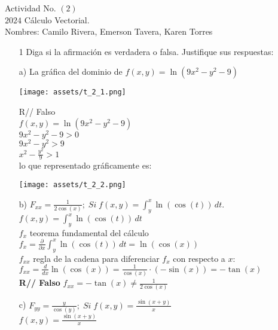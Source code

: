 \documentclass[14pt]{memoir}
\begin{document}
\begin{center}
			\centering
			Actividad No. $(2)$\\
			$2024$ Cálculo Vectorial.\\
			Nombres:  Camilo Rivera, Emerson Tavera, Karen Torres
\end{center}

\begin{enumerate}

	\item[ 1] Diga si la afirmación es verdadera o falsa. Justifique sus respuestas: 
	
	
	
	\item[ a)] La gráfica del dominio de $f(x, y) = \ln(9x^2 - y^2 - 9)$ \\
	\begin{center}
	\texttt{[image: assets/t\_2\_1.png]} 
	\end{center}
	
	R// Falso\\
	 $f(x, y) = \ln(9x^2 - y^2 - 9)$ \\
	$9x^2 - y^2 - 9 > 0$\\
	$9x^2 - y^2 > 9$\\
	$x^2 - \frac{y^2}{9} > 1$\\ 
	
	lo que representado gráficamente es:
	\begin{center}
	\texttt{[image: assets/t\_2\_2.png]} 
	\end{center}
	
	
\item[ b)] $F_{xx} = \frac{1}{2\cos(x)}; \;Si\;  f(x, y) = \int_y^x \ln(\cos(t)) \, dt.$ \\
	
$f(x, y) = \int_y^x \ln(\cos(t)) \, dt $ \\

{\tiny \(f_x\) teorema fundamental del cálculo}\\
$f_x = \frac{\partial}{\partial x} \int_y^x \ln(\cos(t)) \, dt = \ln(\cos(x))$\\

{\tiny\(f_{xx}\)  regla de la cadena para diferenciar \(f_x\) con respecto a \(x\):}\\
$f_{xx} = \frac{d}{dx} \ln(\cos(x)) = \frac{1}{\cos(x)} \cdot (-\sin(x)) = -\tan(x)$\\

\textbf{ R// Falso} $f_{xx} = -\tan(x) \neq \frac{1}{2\cos(x)}$\\

\item[ c)] $F_{yy} = \frac{y}{\cos(y)}; \; Si \;f(x, y) = \frac{\sin(x+y)}{x} $ \\

$f(x, y) = \frac{\sin(x+y)}{x}$\\

	
	
\end{enumerate}	
\end{document}
